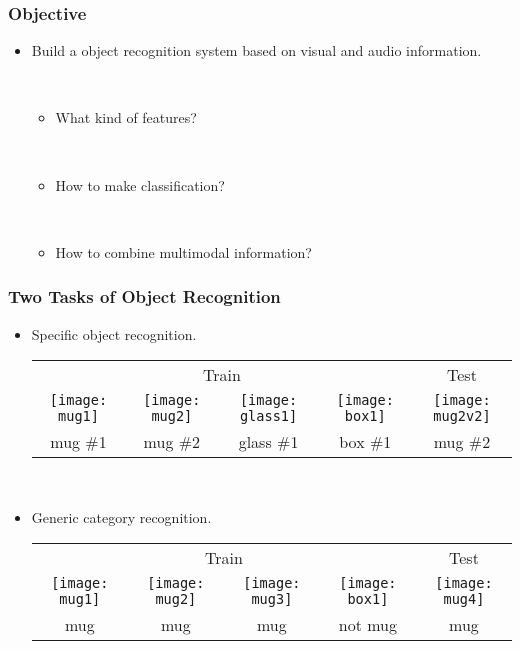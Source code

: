 \documentclass{beamer}
\begin{document}
\begin{frame}
  \frametitle{Objective}

  \begin{itemize}
    \item Build a object recognition system based on visual and audio information.

      ~
      \begin{itemize}
        \item What kind of features?

          ~
        \item How to make classification?

          ~
        \item How to combine multimodal information?
      \end{itemize}
  \end{itemize}
\end{frame}

\begin{frame}
  \frametitle{Two Tasks of Object Recognition}

  \begin{itemize}
    \item Specific object recognition.
      \begin{tabular}{cccc|c}
        \multicolumn{4}{c}{Train} & Test \\
        \texttt{[image: mug1]} & \texttt{[image: mug2]} & \texttt{[image: glass1]} & \texttt{[image: box1]} & \texttt{[image: mug2v2]} \\
        mug \#1 & mug \#2 & glass \#1 & box \#1 & mug \#2 \\
      \end{tabular}

      ~
    \item Generic category recognition.
      \begin{tabular}{cccc|c}
        \multicolumn{4}{c}{Train} & Test \\
        \texttt{[image: mug1]} & \texttt{[image: mug2]} & \texttt{[image: mug3]} & \texttt{[image: box1]} & \texttt{[image: mug4]} \\
        mug & mug & mug & not mug & mug \\
      \end{tabular}

  \end{itemize}
\end{frame}
\end{document}

